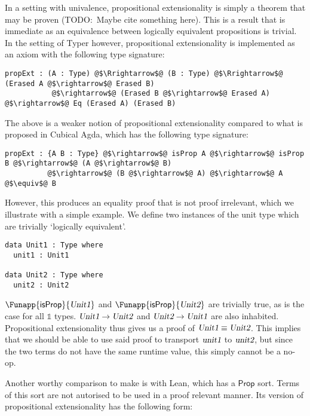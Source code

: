 \documentclass[11pt]{article}
\newcommand\kw[1] {\textsf{#1}}
\newcommand\id[1] {\textsl{#1}}
\begin{document}
In a setting with univalence, propositional extensionality is simply a theorem that may be proven (TODO:\ Maybe cite something here). This is a result that is immediate as an equivalence between logically equivalent propositions is trivial. In the setting of Typer however, propositional extensionality is implemented as an axiom with the following type signature:

\begin{verbatim}
propExt : (A : Type) @$\Rrightarrow$@ (B : Type) @$\Rrightarrow$@ (Erased A @$\rightarrow$@ Erased B)
           @$\rightarrow$@ (Erased B @$\rightarrow$@ Erased A) @$\rightarrow$@ Eq (Erased A) (Erased B)
\end{verbatim}

The above is a weaker notion of propositional extensionality compared to what is proposed in Cubical Agda, which has the following type signature:

\begin{verbatim}
propExt : {A B : Type} @$\rightarrow$@ isProp A @$\rightarrow$@ isProp B @$\rightarrow$@ (A @$\rightarrow$@ B)
          @$\rightarrow$@ (B @$\rightarrow$@ A) @$\rightarrow$@ A @$\equiv$@ B
\end{verbatim}

However, this produces an equality proof that is not proof irrelevant, which we illustrate with a simple example. We define two instances of the unit type which are trivially `logically equivalent'.

\begin{verbatim}
data Unit1 : Type where
  unit1 : Unit1

data Unit2 : Type where
  unit2 : Unit2
\end{verbatim}

$\Funapp{\kw{isProp}}{\id{Unit1}}$ and $\Funapp{\kw{isProp}}{\id{Unit2}}$ are trivially true, as is the case for all $\mathbb{1}$ types. $\id{Unit1} \rightarrow \id{Unit2}$ and $\id{Unit2} \rightarrow \id{Unit1}$ are also inhabited. Propositional extensionality thus gives us a proof of $\id{Unit1} \equiv \id{Unit2}$. This implies that we should be able to use said proof to transport $\id{unit1}$ to $\id{unit2}$, but since the two terms do not have the same runtime value, this simply cannot be a no-op.

Another worthy comparison to make is with Lean, which has a $\kw{Prop}$ sort. Terms of this sort are not autorised to be used in a proof relevant manner. Its version of propositional extensionality has the following form:
\end{document}
